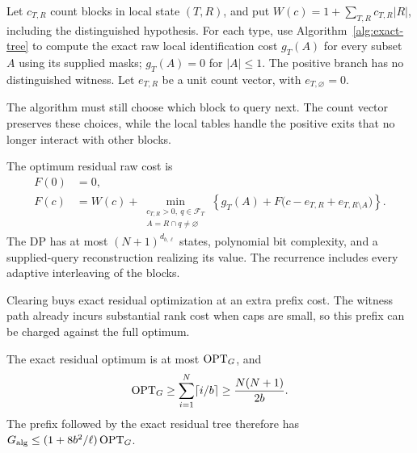 Let $c_{T,R}$ count blocks in local state $(T,R)$, and put
$W(c)=1+\sum_{T,R}c_{T,R}|R|$, including the distinguished hypothesis.
For each type, use Algorithm~\ref{alg:exact-tree} to compute the exact
raw local identification cost $g_T(A)$ for every subset $A$ using
its supplied masks; $g_T(A)=0$ for $|A|\le1$. The positive branch
has no distinguished witness. Let $e_{T,R}$ be a unit count vector,
with $e_{T,\varnothing}=0$.

The algorithm must still choose which block to query next. The
count vector preserves these choices, while the local tables handle
the positive exits that no longer interact with other blocks.

\begin{proposition}
\label{prop:uniform-cap-count-dp}
The optimum residual raw cost is
\begin{equation}\label{eq:uniform-cap-count-dp}
 \begin{aligned}
 F(0)&=0,\\
 F(c)&=W(c)+\min_{\substack{c_{T,R}>0,\ q\in\mathcal F_T\\
                          A=R\cap q\ne\varnothing}}
 \left\{g_T(A)+F\bigl(c-e_{T,R}+e_{T,R\setminus A}\bigr)\right\}.
 \end{aligned}
\end{equation}
The DP has at most $(N+1)^{d_{b,\ell}}$ states, polynomial bit
complexity, and a supplied-query reconstruction realizing its value.
The recurrence includes every adaptive interleaving of the blocks.
\end{proposition}

Clearing buys exact residual optimization at an extra prefix cost.
The witness path already incurs substantial rank cost when caps are
small, so this prefix can be charged against the full optimum.

\begin{proposition}
\label{prop:uniform-cap-charge}
The exact residual optimum is at most $\operatorname{OPT}_G$, and
\begin{equation}\label{eq:uniform-cap-rank-lower}
 \operatorname{OPT}_G\ge\sum_{i=1}^N\lceil i/b\rceil
          \ge\frac{N(N+1)}{2b}.
\end{equation}
The prefix followed by the exact residual tree therefore has
$G_{\rm alg}\le(1+8b^2/\ell)\operatorname{OPT}_G$.
\end{proposition}



